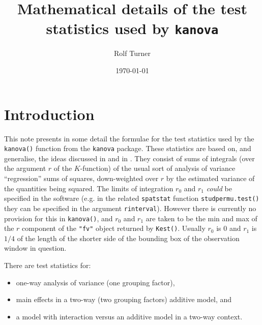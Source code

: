 \documentclass[12pt]{article}
\begin{document}
\cleanlookdateon
\title{Mathematical details of the test statistics used by \texttt{kanova}}
\author{Rolf Turner}
\date{\today}
\maketitle

\section{Introduction}
\label{sec:intro}
This note presents in some detail the formulae for the test statistics
used by the \texttt{kanova()} function from the \texttt{kanova}
package.  These statistics are based on, and generalise, the
ideas discussed in \cite{DiggleEtAl2000} and in \cite{Hahn2012}.
They consist of sums of integrals (over the argument $r$ of the
$K$-function) of the usual sort of analysis of variance ``regression'' sums of
squares, down-weighted over $r$ by the estimated variance of the
quantities being squared.  The limits of integration $r_0$ and $r_1$
\emph{could} be specified in the software (e.g. in the related
\texttt{spatstat} function \texttt{studpermu.test()} they can be
specified in the argument \texttt{rinterval}).  However there is
currently no provision for this in \texttt{kanova()}, and $r_0$ and
$r_1$ are taken to be the min and max of the $r$ component of the
\texttt{"fv"} object returned by \texttt{Kest()}.   Usually $r_0$
is 0 and $r_1$ is $1/4$ of the length of the shorter side of the
bounding box of the observation window in question.

There are test statistics for:
\begin{itemize}
\item one-way analysis of variance (one grouping factor),
\item main effects in a two-way (two grouping factors) additive model, and
\item a model with interaction versus an additive model in a two-way
context.
\end{itemize}
\end{document}
